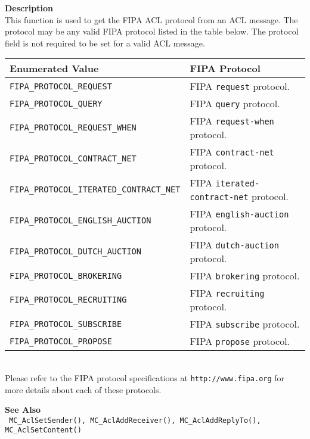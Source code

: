 \noindent
{\bf Description}\\
This function is used to get the FIPA ACL protocol from an ACL message. 
The protocol may be any valid FIPA protocol listed in the table 
below. The protocol field is not required to be set for a valid ACL
message. \\
\begin{tabular}{ll}
Enumerated Value & FIPA Protocol \\ \hline
\texttt{FIPA\_PROTOCOL\_REQUEST} & FIPA \texttt{request} protocol. \\
\texttt{FIPA\_PROTOCOL\_QUERY} & FIPA \texttt{query} protocol. \\
\texttt{FIPA\_PROTOCOL\_REQUEST\_WHEN} & FIPA \texttt{request-when} protocol. \\
\texttt{FIPA\_PROTOCOL\_CONTRACT\_NET} & FIPA \texttt{contract-net} protocol. \\
\texttt{FIPA\_PROTOCOL\_ITERATED\_CONTRACT\_NET} & FIPA \texttt{iterated-contract-net} protocol. \\
\texttt{FIPA\_PROTOCOL\_ENGLISH\_AUCTION} & FIPA \texttt{english-auction} protocol.\\
\texttt{FIPA\_PROTOCOL\_DUTCH\_AUCTION} & FIPA \texttt{dutch-auction} protocol. \\
\texttt{FIPA\_PROTOCOL\_BROKERING} & FIPA \texttt{brokering} protocol. \\
\texttt{FIPA\_PROTOCOL\_RECRUITING} & FIPA \texttt{recruiting} protocol. \\
\texttt{FIPA\_PROTOCOL\_SUBSCRIBE} & FIPA \texttt{subscribe} protocol. \\
\texttt{FIPA\_PROTOCOL\_PROPOSE} & FIPA \texttt{propose} protocol. \\
\end{tabular} \\
Please refer to the FIPA protocol specifications at \texttt{http://www.fipa.org} for 
more details about each of these protocols.


\noindent
{\bf See Also}\\
\texttt{
  MC\_AclSetSender(), MC\_AclAddReceiver(), MC\_AclAddReplyTo(), \linebreak 
    MC\_AclSetContent()
}

